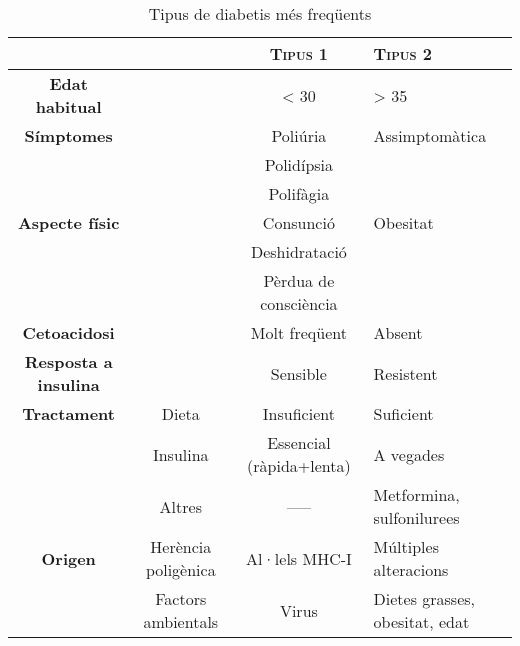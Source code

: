 \begin{table}[H]
  \centering
\begin{tabular}{ccc>{\centering}p{3cm}}
\cline{3-4} 
 &  & \textbf{\textsc{Tipus 1}} & \textbf{\textsc{Tipus 2}}\tabularnewline
\hline 
\textbf{Edat habitual} &  & < 30 & > 35\tabularnewline
\hline 
\textbf{Símptomes} &  & Poliúria & Assimptomàtica\tabularnewline
 &  & Polidípsia & \tabularnewline
 &  & Polifàgia & \tabularnewline
\hline 
\textbf{Aspecte físic} &  & Consunció & Obesitat\tabularnewline
 &  & Deshidratació & \tabularnewline
 &  & Pèrdua de consciència & \tabularnewline
\hline 
\textbf{Cetoacidosi} &  & Molt freqüent & Absent\tabularnewline
\hline 
\textbf{Resposta a insulina} &  & Sensible & Resistent\tabularnewline
\hline 
\textbf{Tractament} & Dieta & Insuficient & Suficient\tabularnewline
 & Insulina & Essencial (ràpida+lenta) & A vegades\tabularnewline
 & Altres & ----- & Metformina, sulfonilurees\tabularnewline
\hline 
\textbf{Origen} & Herència poligènica & Al·lels MHC-I & Múltiples alteracions\tabularnewline
 & Factors ambientals & Virus & Dietes grasses, obesitat, edat\tabularnewline
\hline 
\end{tabular}
  \caption{Tipus de diabetis més freqüents}
  \label{tab:tab_diabetis}
\end{table}

